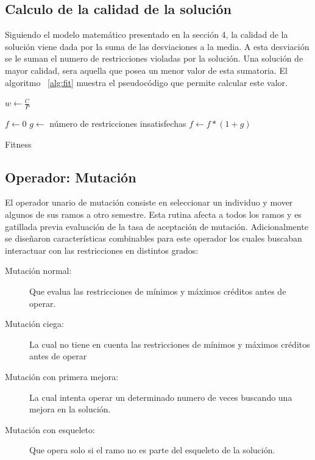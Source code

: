 \documentclass[letter, 10pt]{article}
\begin{document}
\subsection{Calculo de la calidad de la solución}
Siguiendo el modelo matemático presentado en la sección 4, la calidad de la
solución viene dada por la suma de las desviaciones a la media.  A esta
desviación se le suman el numero de restricciones violadas por la solución. Una
solución de mayor calidad, sera aquella que posea un menor valor de esta
sumatoria. El algoritmo ~\ref{alg:fit} muestra el pseudocódigo que permite
calcular este valor.

\begin{algorithm}[H]
\SetLine
{}
$w \gets \frac{C}{P}$

$f \gets 0$ \;
$g \gets$ número de restricciones insatisfechas \;
$f \gets f * (1+g)$ \;


\caption{Fitness}
\label{alg:fit}
\end{algorithm}


\subsection{Operador: Mutación}
El operador unario de mutación consiste en seleccionar un individuo y mover
algunos de sus ramos a otro semestre.  Esta rutina afecta a todos los ramos y es
gatillada previa evaluación de la tasa de aceptación de mutación.
Adicionalmente se diseñaron características combinables para este operador los
cuales buscaban interactuar con las restricciones en distintos grados:

\begin{description}
\item[Mutación normal:] Que evalua las restricciones de mínimos y
  máximos créditos antes de operar.
\item[Mutación ciega: ] La cual no tiene en cuenta las restricciones de
  mínimos y máximos créditos antes de operar
\item[Mutación con primera mejora:] La cual intenta operar un
  determinado numero de veces buscando una mejora en la solución.
\item[Mutación con esqueleto:] Que opera solo si el ramo no es parte del
  esqueleto de la solución.
\end{description}
\end{document}
